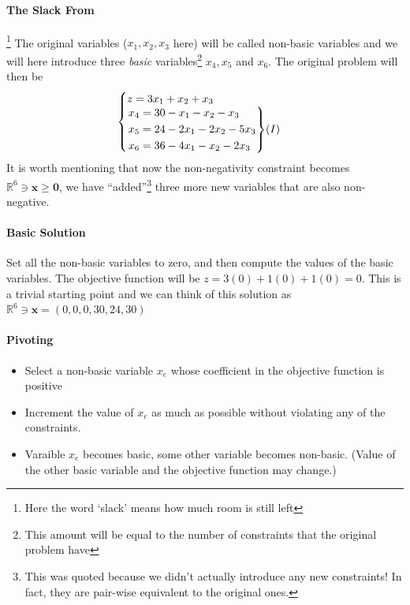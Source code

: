 \documentclass[10pt]{article}
\newcommand{\real}{\mathbb{R}}
\newcommand{\vzero}{\mathbf{0}}
\newcommand{\bx}{\mathbf{x}}
\newenvironment{rcases}
  {\left.\begin{aligned}}
  {\end{aligned}\right\rbrace}
\begin{document}
\paragraph{The Slack From}\footnote{Here the word `slack' means how much room is still left} The original variables ($x_1, x_2, x_3$ here) will be called non-basic variables and we will here introduce three \textit{basic} variables\footnote{This amount will be equal to the number of constraints that the original problem have} $x_4, x_5$ and $x_6$. The original problem will then be
\begin{equation*}
    \begin{cases}
        z = 3x_1 + x_2 +x_3 \\
        \begin{rcases}
            x_4 &= 30 - x_1 - x_2 - x_3 \\
            x_5 &= 24 - 2x_1 - 2x_2 - 5x_3 \\
            x_6 &= 36 - 4x_1 - x_2 - 2x_3
        \end{rcases}
        (I)
    \end{cases}
\end{equation*}
It is worth mentioning that now the non-negativity constraint becomes $\real^6 \ni \bx \geq \vzero$, we have ``added''\footnote{This was quoted because we didn't actually introduce any new constraints! In fact, they are pair-wise equivalent to the original ones.} three more new variables that are also non-negative.

\paragraph{Basic Solution} Set all the non-basic variables to zero, and then compute the values of the basic variables. The objective function will be $z = 3(0) + 1(0) + 1(0) = 0$. This is a trivial starting point and we can think of this solution as $\real^6 \ni \bx = (0,0,0,30, 24, 30)$

\paragraph{Pivoting} 
\begin{itemize}
    \item Select a non-basic variable $x_e$ whose coefficient in the objective function is positive
    \item Increment the value of $x_e$ as much as possible without violating any of the constraints. 
    \item Varaible $x_e$ becomes basic, some other variable becomes non-basic. (Value of the other basic variable and the objective function may change.) 
\end{itemize}
\end{document}
